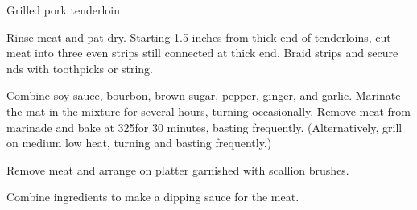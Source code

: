 \begin{recipe}{Grilled pork tenderloin}{}{}


Rinse meat and pat dry.
Starting 1.5 inches from thick end of tenderloins, cut meat into three even strips still connected at thick end.
Braid strips and secure nds with toothpicks or string.

Combine soy sauce, bourbon, brown sugar, pepper, ginger, and garlic.
Marinate the mat in the mixture for several hours, turning occasionally.
Remove meat from marinade and bake at 325\degrees for 30 minutes, basting frequently.
(Alternatively, grill on medium low heat, turning and basting frequently.)

Remove meat and arrange on platter garnished with scallion brushes.

Combine ingredients to make a dipping sauce for the meat.

\end{recipe}